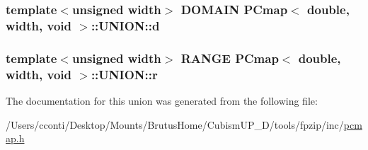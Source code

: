 \subsubsection[{d}]{\setlength{\rightskip}{0pt plus 5cm}template$<$unsigned width$>$ {\bf D\+O\+M\+A\+I\+N} {\bf P\+Cmap}$<$ double, width, void $>$\+::U\+N\+I\+O\+N\+::d}\label{union_p_cmap_3_01double_00_01width_00_01void_01_4_1_1_u_n_i_o_n_ad3136120a5b816e73044fc0f4373a506}
\hypertarget{union_p_cmap_3_01double_00_01width_00_01void_01_4_1_1_u_n_i_o_n_a451f19f6f97a069f7c465b069590e3c8}{}
\subsubsection[{r}]{\setlength{\rightskip}{0pt plus 5cm}template$<$unsigned width$>$ {\bf R\+A\+N\+G\+E} {\bf P\+Cmap}$<$ double, width, void $>$\+::U\+N\+I\+O\+N\+::r}\label{union_p_cmap_3_01double_00_01width_00_01void_01_4_1_1_u_n_i_o_n_a451f19f6f97a069f7c465b069590e3c8}


The documentation for this union was generated from the following file\+:\begin{DoxyCompactItemize}
\item 
/\+Users/cconti/\+Desktop/\+Mounts/\+Brutus\+Home/\+Cubism\+U\+P\+\_\+D/tools/fpzip/inc/\hyperlink{pcmap_8h}{pcmap.\+h}\end{DoxyCompactItemize}
